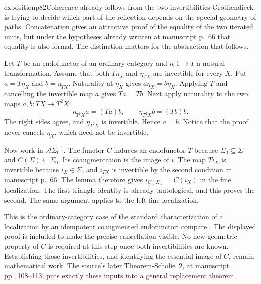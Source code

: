 \begin{dcomment}{exposition}{p82}{Coherence already follows from the two invertibilities}
Grothendieck is trying to decide which part of the reflection depends on the special geometry of paths. Concatenation gives an attractive proof of the equality of the two iterated units, but under the hypotheses already written at manuscript p.~66 that equality is also formal. The distinction matters for the abstraction that follows.

Let $T$ be an endofunctor of an ordinary category and $\eta:1\to T$ a natural transformation. Assume that both $T\eta_X$ and $\eta_{TX}$ are invertible for every $X$. Put $a=T\eta_X$ and $b=\eta_{TX}$. Naturality at $\eta_X$ gives $a\eta_X=b\eta_X$. Applying $T$ and cancelling the invertible map $a$ gives $Ta=Tb$. Next apply naturality to the two maps $a,b:TX\to T^2X$:
\[
 \eta_{T^2X}a=(Ta)b,
 \qquad \eta_{T^2X}b=(Tb)b.
\]
The right sides agree, and $\eta_{T^2X}$ is invertible. Hence $a=b$. Notice that the proof never cancels $\eta_X$, which need not be invertible.

Now work in $\mathcal A\Sigma_0^{-1}$. The functor $C$ induces an endofunctor $T$ because $\Sigma_0\subseteq\Sigma$ and $C(\Sigma)\subseteq\Sigma_0$. Its coaugmentation is the image of $i$. The map $Ti_X$ is invertible because $i_X\in\Sigma$, and $i_{TX}$ is invertible by the second condition at manuscript p.~66. The lemma therefore gives $i_{C(X)}=C(i_X)$ in the fine localization. The first triangle identity is already tautological, and this proves the second. The same argument applies to the left-fine localization.

This is the ordinary-category case of the standard characterization of a localization by an idempotent coaugmented endofunctor; compare \citet[Proposition~5.2.7.4]{Lurie2009HTT}. The displayed proof is included to make the precise cancellation visible. No new geometric property of $C$ is required at this step once both invertibilities are known. Establishing those invertibilities, and identifying the essential image of $C$, remain mathematical work. The source's later Theorem-Scholie~2, at manuscript pp.~108--113, puts exactly these inputs into a general replacement theorem.
\end{dcomment}

